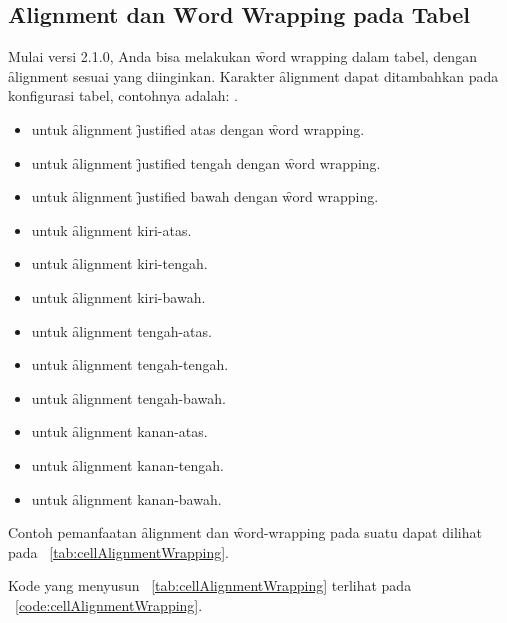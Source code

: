 \subsection{\f{Alignment} dan \f{Word Wrapping} pada Tabel}
\label{sec:cellAlignmentAndWordWrap}
Mulai versi 2.1.0, Anda bisa melakukan \f{word wrapping} dalam tabel, dengan \f{alignment} sesuai yang diinginkan.
Karakter \f{alignment} dapat ditambahkan pada konfigurasi tabel, contohnya adalah: .

\begin{itemize}
	\item {} untuk \f{alignment} \f{justified} atas dengan \f{word wrapping}.
	\item {} untuk \f{alignment} \f{justified} tengah dengan \f{word wrapping}.
	\item {} untuk \f{alignment} \f{justified} bawah dengan \f{word wrapping}.
	\item {} untuk \f{alignment} kiri-atas.
	\item {} untuk \f{alignment} kiri-tengah.
	\item {} untuk \f{alignment} kiri-bawah.
	\item {} untuk \f{alignment} tengah-atas.
	\item {} untuk \f{alignment} tengah-tengah.
	\item {} untuk \f{alignment} tengah-bawah.
	\item {} untuk \f{alignment} kanan-atas.
	\item {} untuk \f{alignment} kanan-tengah.
	\item {} untuk \f{alignment} kanan-bawah.
\end{itemize}

Contoh pemanfaatan \f{alignment} dan \f{word-wrapping} pada suatu  dapat dilihat pada \tab~\ref{tab:cellAlignmentWrapping}.



Kode yang menyusun \tab~\ref{tab:cellAlignmentWrapping} terlihat pada \lst~\ref{code:cellAlignmentWrapping}.




